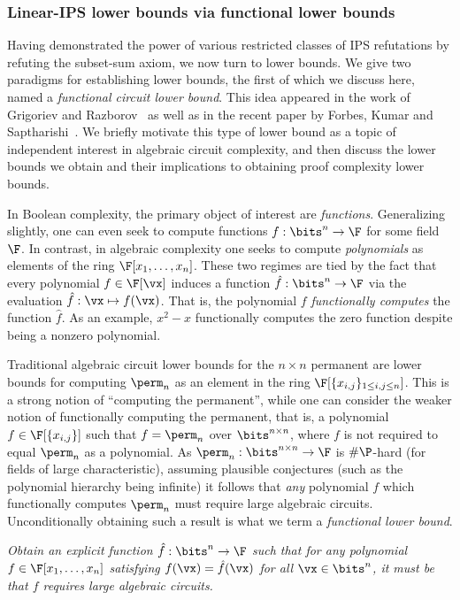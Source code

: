\documentclass[11pt]{article}
\numberwithin{equation}{section}
\theoremstyle{definition}
\theoremstyle{plain}
\begin{document}
\subsubsection{Linear-IPS lower bounds via functional lower bounds}\label{sec:results:funct}

Having demonstrated the power of various restricted classes of IPS refutations by refuting the subset-sum axiom, we now turn to lower bounds.  We give two paradigms for establishing lower bounds, the first of which we discuss here, named a \emph{functional circuit lower bound}. This idea appeared in the work of Grigoriev and Razborov~\cite{GrigorievRazborov00} as well as in the recent paper by
Forbes, Kumar and Saptharishi~\cite{ForbesKS16}. We briefly motivate this type of lower bound as a topic of independent interest in algebraic circuit complexity, and then discuss the lower bounds we obtain and their implications to obtaining proof complexity lower bounds.

In Boolean complexity, the primary object of interest are \emph{functions}.  Generalizing slightly, one can even seek to compute functions $f:\bits^n\to\F$ for some field $\F$.  In contrast, in algebraic complexity one seeks to compute \emph{polynomials} as elements of the ring $\F[x_1,\ldots,x_n]$. These two regimes are tied by the fact that every polynomial $f\in\F[\vx]$ induces a function $\hat{f}:\bits^n\to \F$ via the evaluation $\hat{f}:\vx\mapsto f(\vx)$.  That is, the polynomial $f$ \emph{functionally computes} the function $\hat{f}$.  As an example, $x^2-x$ functionally computes the zero function despite being a nonzero polynomial.

Traditional algebraic circuit lower bounds for the $n\times n$ permanent are lower bounds for computing $\perm_n$ as an element in the ring $\F[\{x_{i,j}\}_{1\le i,j\le n}]$. This is a strong notion of ``computing the permanent'', while one can consider the weaker notion of functionally computing the permanent, that is, a polynomial $f\in\F[\{x_{i,j}\}]$ such that $f=\perm_n$ over $\bits^{n\times n}$, where $f$ is not required to equal $\perm_n$ as a polynomial.  As $\perm_n:\bits^{n\times n}\to\F$ is $\#\P$-hard (for fields of large characteristic), assuming plausible conjectures (such as the polynomial hierarchy being infinite) it follows that \emph{any} polynomial $f$ which functionally computes $\perm_n$ must require large algebraic circuits.  Unconditionally obtaining such a result is what we term a \emph{functional lower bound}.

\begin{goal}
\emph{Obtain an explicit function $\hat{f}:\bits^n\to\F$ such that for any polynomial $f\in\F[x_1,\ldots,x_n]$ satisfying $f(\vx)=\hat{f}(\vx)$ for all $\vx\in\bits^n$, it must be that $f$ requires large algebraic circuits.}
\end{goal}
\end{document}
